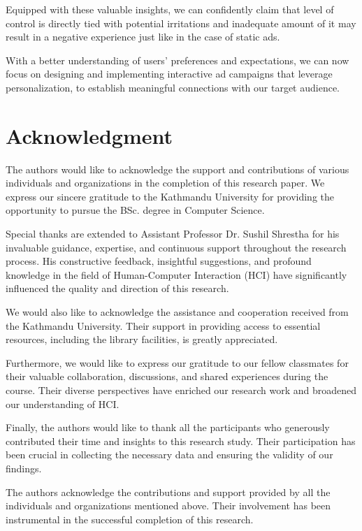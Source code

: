 \documentclass[journal]{IEEEtran}
\begin{document}
Equipped with these valuable insights, we can confidently claim that level of control is directly
tied with potential irritations and inadequate amount of it may result in a negative experience just like in the
case of static ads.

With a better understanding of users' preferences and expectations,
we can now focus on designing and implementing interactive ad campaigns that leverage personalization,
to establish meaningful connections with our target audience.


\section*{Acknowledgment}
The authors would like to acknowledge the support and contributions of various
individuals and organizations in the completion of this research paper. We
express our sincere gratitude to the Kathmandu University for providing the
opportunity to pursue the BSc. degree in Computer Science.

Special thanks are extended to Assistant Professor Dr. Sushil Shrestha for
his invaluable guidance, expertise, and continuous support throughout the
research process. His constructive feedback, insightful suggestions, and
profound knowledge in the field of Human-Computer Interaction (HCI) have
significantly influenced the quality and direction of this research.

We would also like to acknowledge the assistance and cooperation received
from the  Kathmandu University. Their support in providing access to essential
resources, including the library facilities, is greatly appreciated.

Furthermore, we would like to express our gratitude to our fellow classmates
for their valuable collaboration, discussions, and shared experiences during
the course. Their diverse perspectives have enriched our research work and
broadened our understanding of HCI.

Finally, the authors would like to thank all the participants who generously
contributed their time and insights to this research study. Their participation
has been crucial in collecting the necessary data and ensuring the validity of
our findings.

The authors acknowledge the contributions and support provided by all the
individuals and organizations mentioned above. Their involvement has been
instrumental in the successful completion of this research.

\ifCLASSOPTIONcaptionsoff
    \newpage
\fi



\end{document}
